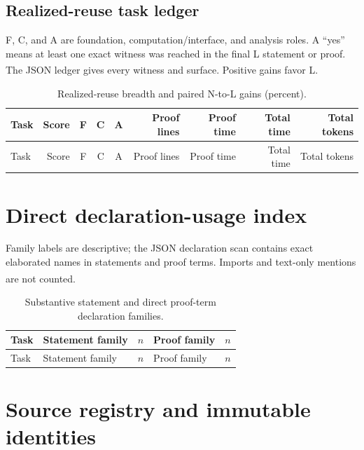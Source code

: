 \documentclass[10pt,a4paper]{article}
\newcommand{\src}[1]{\textsuperscript{\cite{#1}}}
\begin{document}
\begin{landscape}
\section{Realized-reuse task ledger}

F, C, and A are foundation, computation/interface, and analysis roles. A
``yes'' means at least one exact witness was reached in the final L
statement or proof. The JSON ledger gives every witness and surface.
Positive gains favor L.\src{reusemap,reuse}

\small
\begin{longtable}{@{}lrcccrrrr@{}}
\caption{Realized-reuse breadth and paired N-to-L gains (percent).
\cite{reuse,plotcode}}\label{tab:reuse}\\
\toprule Task & Score & F & C & A & Proof lines & Proof time & Total time & Total tokens\\\midrule\endfirsthead
\toprule Task & Score & F & C & A & Proof lines & Proof time & Total time & Total tokens\\\midrule\endhead

\end{longtable}
\end{landscape}

\section{Direct declaration-usage index}

Family labels are descriptive; the JSON declaration scan contains exact
elaborated names in statements and proof terms. Imports and text-only
mentions are not counted.\src{declscan,taskledger}

\small
\begin{longtable}{@{}p{}p{}rp{}r@{}}
\caption{Substantive statement and direct proof-term declaration families.
\cite{declscan,plotcode}}\\
\toprule Task & Statement family & $n$ & Proof family & $n$\\\midrule\endfirsthead
\toprule Task & Statement family & $n$ & Proof family & $n$\\\midrule\endhead

\end{longtable}
\normalsize

\section{Source registry and immutable identities}
\end{document}
